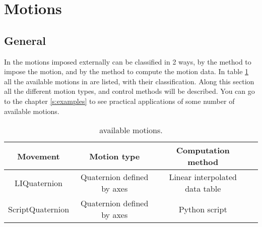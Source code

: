 \section{Motions}
\label{ss:aquagpusph:motions}
%
\subsection{General}
%
In \NAME the motions imposed externally can be classified in 2 ways, by the method to impose the motion, and
by the method to compute the motion data. In table \ref{tables:aquagpusph:motions} all the available motions
in \NAME are listed, with their classification.\rc
%
Along this section all the different motion types, and control methods will be described. You can go to the
chapter \ref{s:examples} to see practical applications of some number of available motions.
%
\begin{table}[h!b!p!]\small
	\centering
	\begin{tabular}{| c | c | c | l | }
		\hline
		\cellcolor[rgb]{0.7,0.7,0.7}Movement & \cellcolor[rgb]{0.7,0.7,0.7}Motion type & \cellcolor[rgb]{0.7,0.7,0.7}Computation method \\
		\hline
		LIQuaternion     & Quaternion defined by axes & Linear interpolated data table \\
		\hline
		ScriptQuaternion & Quaternion defined by axes & Python script \\
		\hline
	\end{tabular}
	\caption{\NAME available motions.}
	\label{tables:aquagpusph:motions}
\end{table}
%


%

%
